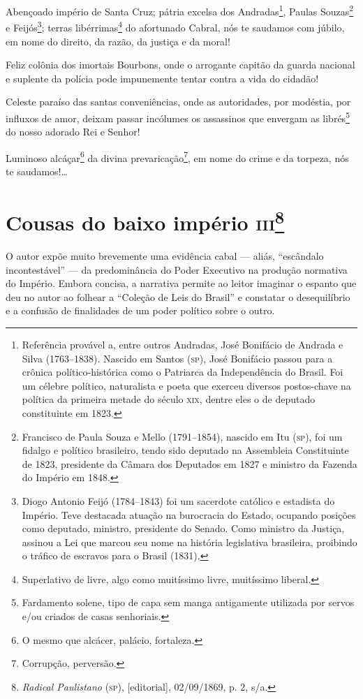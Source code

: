 Abençoado império de Santa Cruz; pátria excelsa dos Andradas\footnote{
  Referência provável a, entre outros Andradas, José Bonifácio de
  Andrada e Silva (1763--1838). Nascido em Santos (\textsc{sp}), José Bonifácio
  passou para a crônica político-histórica como o Patriarca da
  Independência do Brasil. Foi um célebre político, naturalista e poeta
  que exerceu diversos postos-chave na política da primeira metade do
  século \textsc{xix}, dentre eles o de deputado constituinte em 1823.}, Paulas
Souzas\footnote{Francisco de Paula Souza e Mello (1791--1854), nascido
  em Itu (\textsc{sp}), foi um fidalgo e político brasileiro, tendo sido deputado
  na Assembleia Constituinte de 1823, presidente da Câmara dos Deputados
  em 1827 e ministro da Fazenda do Império em 1848.} e
Feijós\footnote{Diogo Antonio Feijó (1784--1843) foi um sacerdote
  católico e estadista do Império. Teve destacada atuação na burocracia
  do Estado, ocupando posições como deputado, ministro, presidente do
  Senado. Como ministro da Justiça, assinou a Lei que marcou seu nome na
  história legislativa brasileira, proibindo o tráfico de escravos para
  o Brasil (1831).}; terras libérrimas\footnote{Superlativo de livre,
  algo como muitíssimo livre, muitíssimo liberal.} do afortunado Cabral,
nós te saudamos com júbilo, em nome do direito, da razão, da justiça e
da moral!

Feliz colônia dos imortais Bourbons, onde o arrogante capitão da guarda
nacional e suplente da polícia pode impunemente tentar contra a vida do
cidadão!

Celeste paraíso das santas conveniências, onde as autoridades, por
modéstia, por influxos de amor, deixam passar incólumes os assassinos
que envergam as librés\footnote{Fardamento solene, tipo de capa sem
  manga antigamente utilizada por servos e/ou criados de casas
  senhoriais.} do nosso adorado Rei e Senhor!

Luminoso alcáçar\footnote{O mesmo que alcácer, palácio, fortaleza.} da
divina prevaricação\footnote{Corrupção, perversão.}, em nome do crime
e da torpeza, nós te saudamos!\ldots{}

\chapter{Cousas do baixo império \textsc{iii}\footnote{\emph{Radical
  Paulistano} (\textsc{sp}), {[}editorial{]}, 02/09/1869, p. 2, s/a.}}

\begin{didascalia}
O autor expõe muito brevemente uma evidência cabal --- aliás, ``escândalo
incontestável'' --- da predominância do Poder Executivo na produção
normativa do Império. Embora concisa, a narrativa permite ao leitor
imaginar o espanto que deu no autor ao folhear a ``Coleção de Leis do
Brasil'' e constatar o desequilíbrio e a confusão de finalidades de um
poder político sobre o outro.
\end{didascalia}



